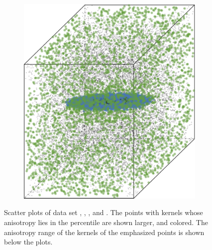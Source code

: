 \begin{figure}
\begin{subfigure}{0.23\textwidth}
					\caption{}
					\label{fig:discussion:anisotropy:baakman4}
				\end{subfigure}		
				\begin{subfigure}{0.23\textwidth}
					\centering
					\includegraphics[keepaspectratio=true, width=\textwidth, height=0.23\textheight]{discussion/img/baakman_5_60000_anisotropy.png}
					\caption{}
					\label{fig:discussion:anisotropy:baakman5}
				\end{subfigure}			
				\caption{Scatter plots of data set
					 \ferdosiOne, %
					 \baakmanOne, %
					 \baakmanFour, and %
					 \baakmanFive. %
					The points with kernels whose anisotropy lies in the  percentile are shown larger, and colored. The anisotropy range of the kernels of the emphasized points is shown below the plots.}
				\label{fig:discussion:anisotropy:singleSphere}
			\end{figure}

